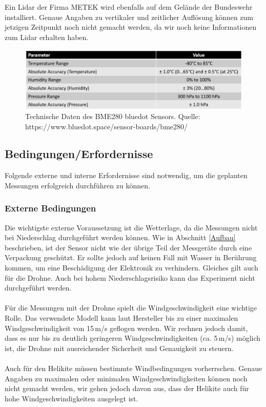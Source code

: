 \documentclass[a4paper,11pt,DIV=calc,tablecaptionabove,headinclude,twoside]{article}
\begin{document}
Ein Lidar der Firma METEK wird ebenfalls auf dem Gelände der Bundeswehr installiert. Genaue Angaben zu vertikaler und zeitlicher Auflösung können zum jetzigen Zeitpunkt noch nicht gemacht werden, da wir noch keine Informationen zum Lidar erhalten haben.  
\begin{figure}[b!]
\centering
\includegraphics[width=\textwidth]{BME_280_technische_Daten.png}
\captionsetup{width=11cm}
\caption{Technische Daten des BME280 bluedot Sensors. Quelle: https://www.bluedot.space/sensor-boards/bme280/}
\label{BME_280}
\end{figure}

\subsection{Bedingungen/Erfordernisse}
\label{Bedingungen}

Folgende externe und interne Erfordernisse sind notwendig, um die geplanten Messungen erfolgreich durchführen zu können.

\subsubsection{Externe Bedingungen}

Die wichtigste externe Voraussetzung ist die Wetterlage, da die Messungen nicht bei Niederschlag durchgeführt werden können. Wie in Abschnitt \ref{Aufbau} beschrieben, ist der Sensor nicht wie der übrige Teil der Messgeräte durch eine Verpackung geschützt. Er sollte jedoch auf keinen Fall mit Wasser in Berührung kommen, um eine Beschädigung der Elektronik zu verhindern. Gleiches gilt auch für die Drohne. Auch bei hohem Niederschlagsrisiko kann das Experiment nicht durchgeführt werden. \\\\
Für die Messungen mit der Drohne spielt die Windgeschwindigkeit eine wichtige Rolle. Das verwendete Modell kann laut Hersteller bis zu einer maximalen Windgeschwindigkeit von 15\,m/s geflogen werden. Wir rechnen jedoch damit, dass es nur bis zu deutlich geringeren Windgeschwindigkeiten (ca. 5\,m/s) möglich ist, die Drohne mit ausreichender Sicherheit und Genauigkeit zu steuern. \\\\
Auch für den Helikite müssen bestimmte Windbedingungen vorherrschen. Genaue Angaben zu maximalen oder minimalen Windgeschwindigkeiten können noch nicht gemacht werden, wir gehen jedoch davon aus, dass der Helikite auch für hohe Windgeschwindigkeiten ausgelegt ist.
\end{document}
